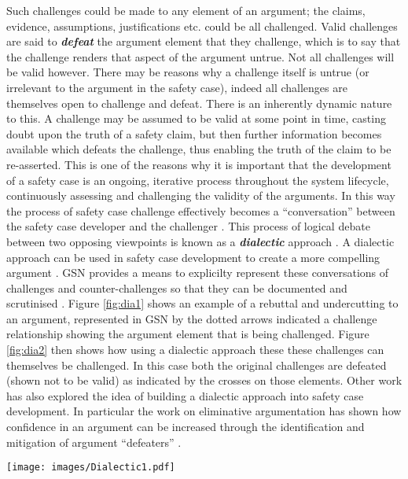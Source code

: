 Such challenges could be made to any element of an argument; the claims, evidence, assumptions, justifications etc. could be all challenged. Valid challenges are said to \textbf{\textit{defeat}} the argument element that they challenge, which is to say that the challenge renders that aspect of the argument untrue. Not all challenges will be valid however. There may be reasons why a challenge itself is untrue (or irrelevant to the argument in the safety case), indeed all challenges are themselves open to challenge and defeat. There is an inherently dynamic nature to this. A challenge may be assumed to be valid at some point in time, casting doubt upon the truth of a safety claim, but then further information becomes available which defeats the challenge, thus enabling the truth of the claim to be re-asserted. This is one of the reasons why it is important that the development of a safety case is an ongoing, iterative process throughout the system lifecycle, continuously assessing and challenging the validity of the arguments. In this way the process of safety case challenge effectively becomes a ``conversation'' between the safety case developer and the challenger \cite{kaas2024assuring}. 
This process of logical debate between two opposing viewpoints is known as a \textbf{\textit{dialectic}} approach \cite{popper1940dialectic} \cite{finocchiaro2003dialectics}. A dialectic approach can be used in safety case development to create a more compelling argument \cite{group2021b}. GSN provides a means to explicilty represent these conversations of challenges and counter-challenges so that they can be documented and scrutinised \cite{group2021a}. Figure \ref{fig:dia1} shows an example of a rebuttal and undercutting to an argument, represented in GSN by the dotted arrows indicated a challenge relationship showing the argument element that is being challenged. Figure \ref{fig:dia2} then shows how using a dialectic approach these these challenges can themselves be challenged. In this case both the original challenges are defeated (shown not to be valid) as indicated by the crosses on those elements. Other work has also explored the idea of building a dialectic approach into safety case development. In particular the work on eliminative argumentation has shown how confidence in an argument can be increased through the identification and mitigation of argument ``defeaters'' \cite{goodenough2015eliminative} \cite{diemert2020eliminative}.

\begin{figure*}
\texttt{[image: images/Dialectic1.pdf]}
\caption{An example of representing dialectic arguments using GSN.}
\label{fig:dia1}
\end{figure*}

